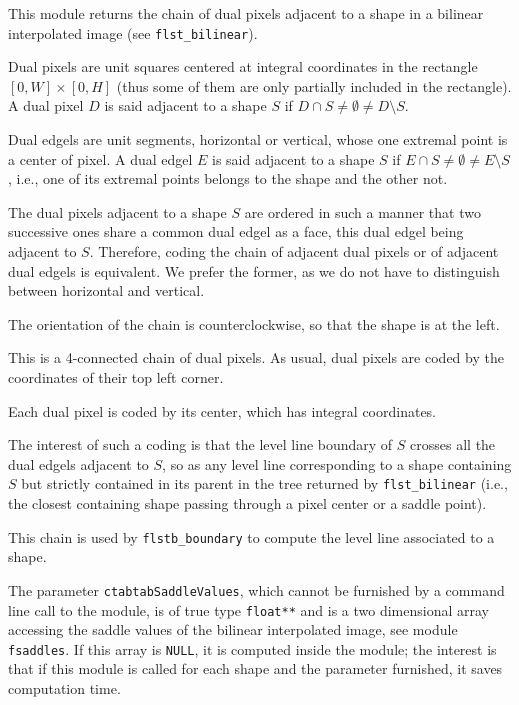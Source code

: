 This module returns the chain of dual pixels adjacent to a shape in a bilinear
interpolated image (see \texttt{flst\_bilinear}).

Dual pixels are unit squares centered at integral coordinates in the rectangle
$[0,W]\times [0,H]$ (thus some of them are only partially included in the
rectangle). A dual pixel $D$ is said adjacent to a shape $S$ if $D\cap S\neq
\emptyset \neq D\setminus S$.

Dual edgels are unit segments, horizontal or vertical, whose one extremal
point is a center of pixel. A dual edgel $E$ is said adjacent to a shape $S$
if $E\cap S\neq \emptyset \neq E\setminus S$, i.e., one of its extremal points
belongs to the shape and the other not.

The dual pixels adjacent to a shape $S$ are ordered in such a manner that two
successive ones share a common dual edgel as a face, this dual edgel being
adjacent to $S$. Therefore, coding the chain of adjacent dual pixels or of
adjacent dual edgels is equivalent. We prefer the former, as we do not have to
distinguish between horizontal and vertical.

The orientation of the chain is counterclockwise, so that the shape is at the
left.

This is a 4-connected chain of dual pixels. As usual, dual pixels are coded by
the coordinates of their top left corner.

Each dual pixel is coded by its center, which has integral coordinates.

The interest of such a coding is that the level line boundary of $S$ crosses
all the dual edgels adjacent to $S$, so as any level line corresponding to a
shape containing $S$ but strictly contained in its parent in the tree returned
by \texttt{flst\_bilinear} 
(i.e., the closest containing shape passing through a
pixel center or a saddle point). 

This chain is used by \texttt{flstb\_boundary} 
to compute the level line associated to a shape.

The parameter \texttt{ctabtabSaddleValues}, which cannot be furnished by a
command line call to the module, is of true type \texttt{float**} and is a two
dimensional array accessing the saddle values of the bilinear interpolated
image, see module \texttt{fsaddles}. If this array is \texttt{NULL}, it is
computed inside the module; the interest is that if this module is called for
each shape and the parameter furnished, it saves computation time.
